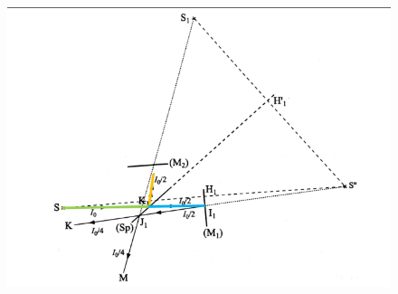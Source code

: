 \documentclass[10pt]{beamer}
\begin{document}
\begin{frame}{\insertsubsection}
    \begin{figure}
        \centering
        \includegraphics[width=1\textwidth]{M2.png}
    \end{figure}
\end{frame}
\end{document}
